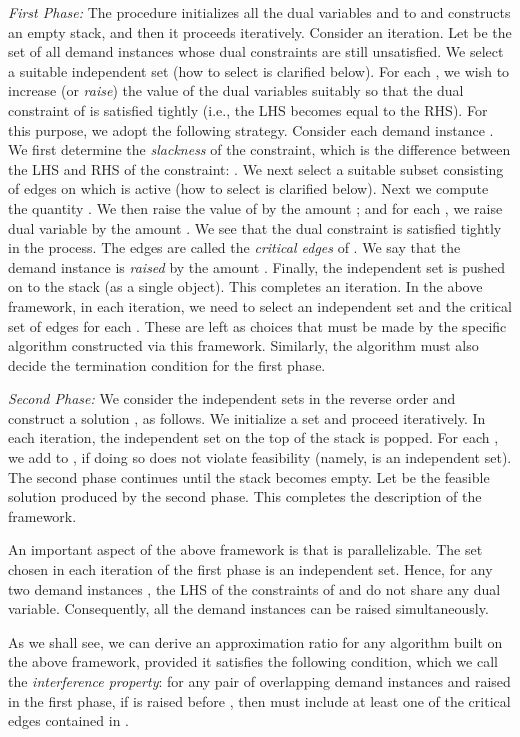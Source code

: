 \documentclass[11pt]{article}
\begin{document}
{\it First Phase: }
The procedure initializes all the dual variables  and  to 
and constructs an empty stack, and then it proceeds iteratively.
Consider an iteration. Let  be the set of all demand instances whose dual constraints are still unsatisfied.
We select a suitable independent set  (how to select  is clarified below).
For each , we wish to increase (or {\em raise}) the value of the dual variables 
suitably so that the dual constraint of  is satisfied tightly (i.e., the LHS becomes equal to the RHS).
For this purpose, we adopt the following strategy.
Consider each demand instance .
We first determine the {\em slackness}  of the constraint, which is the difference between the 
LHS and RHS of the constraint: 
.
We next select a suitable subset  consisting of edges on which  is active
(how to select  is clarified below).
Next we compute the quantity .
We then raise the value of  by the amount ;
and for each , we raise dual variable  by the amount .
We see that the dual constraint is satisfied tightly in the process.
The edges  are called the {\em critical edges} of .
We say that the demand instance  is {\em raised} by the amount .
Finally, the independent set  is pushed on to the stack (as a single object).
This completes an iteration.
In the above framework, in each iteration, we need to select
an independent set  and the critical set of edges  for each . 
These are left as choices that must be made by the
specific algorithm constructed via this framework.
Similarly, the algorithm must also decide the termination condition for the first phase.

{\it Second Phase: } We consider the independent sets in the reverse order
and construct a solution , as follows.
We initialize a set  and proceed iteratively. 
In each iteration, the independent set  on the top of the stack is popped.
For each , we add  to , if doing so does not violate feasibility 
(namely,  is an independent set).
The second phase continues until the stack becomes empty.
Let  be the feasible solution produced by the second phase.
This completes the description of the framework.

An important aspect of the above framework is that is parallelizable.
The set  chosen in each iteration of the first phase is an independent set.
Hence, for any two demand instances , the LHS of the 
constraints of  and  do not share any dual variable.
Consequently, all the demand instances  can be raised simultaneously.

As we shall see, we can derive an approximation ratio for any 
algorithm built on the above framework, provided it satisfies the following condition,
which we call the {\em interference property}:
for any pair of overlapping demand instances  and  raised in the first phase,
if  is raised before , 
then  must include at least one of the critical edges contained in . 
\end{document}
